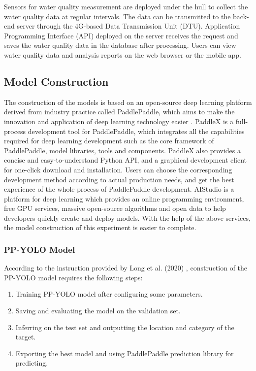 \documentclass[journal,article,submit,moreauthors,pdftex]{Definitions/mdpi}
\begin{document}
Sensors for water quality measurement are deployed under the hull to collect the water quality data at regular intervals. The data can be transmitted to the back-end server through the 4G-based Data Transmission Unit (DTU). Application Programming Interface (API) deployed on the server receives the request and saves the water quality data in the database after processing. Users can view water quality data and analysis reports on the web browser or the mobile app.



\subsection{Model Construction}

The construction of the models is based on an open-source deep learning platform derived from industry practice called PaddlePaddle, which aims to make the innovation and application of deep learning technology easier \cite{ma2019paddlepaddle}.
PaddleX is a full-process development tool for PaddlePaddle, which integrates all the capabilities required for deep learning development such as the core framework of PaddlePaddle, model libraries, tools and components. PaddleX also provides a concise and easy-to-understand Python API, and a graphical development client for one-click download and installation. Users can choose the corresponding development method according to actual production needs, and get the best experience of the whole process of PaddlePaddle development. AIStudio is a platform for deep learning which provides an online programming environment, free GPU services, massive open-source algorithms and open data to help developers quickly create and deploy models. 
With the help of the above services, the model construction of this experiment is easier to complete.

\subsubsection{PP-YOLO Model}

According to the instruction provided by Long et al. (2020) \cite{long2020pp}, construction of the PP-YOLO model requires the following steps:

\begin{enumerate}
\item Training PP-YOLO model after configuring some parameters.
\item Saving and evaluating the model on the validation set.
\item Inferring on the test set and outputting the location and category of the target.
\item Exporting the best model and using PaddlePaddle prediction library for predicting.
\end{enumerate}
\end{document}
